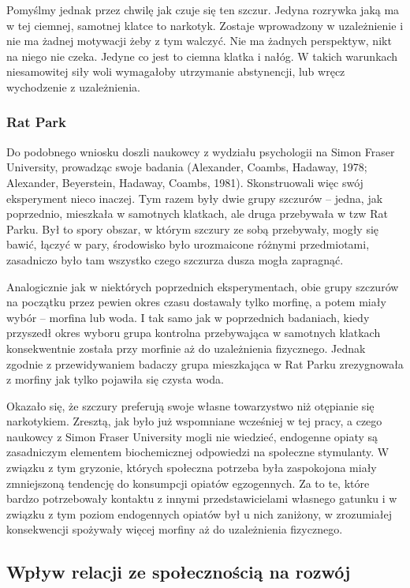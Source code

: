 \documentclass{psychol}
\begin{document}
Pomyślmy jednak przez chwilę jak czuje się ten szczur. Jedyna rozrywka jaką ma w tej ciemnej, samotnej klatce to narkotyk. Zostaje wprowadzony w uzależnienie i nie ma żadnej motywacji żeby z tym walczyć. Nie ma żadnych perspektyw, nikt na niego nie czeka. Jedyne co jest to ciemna klatka i nałóg. W takich warunkach niesamowitej siły woli wymagałoby utrzymanie abstynencji, lub wręcz wychodzenie z uzależnienia.

\subsubsection{Rat Park}

Do podobnego wniosku doszli naukowcy z wydziału psychologii na Simon Fraser University, prowadząc swoje badania (Alexander, Coambs, Hadaway, 1978; Alexander, Beyerstein, Hadaway, Coambs, 1981). Skonstruowali więc swój eksperyment nieco inaczej. Tym razem były dwie grupy szczurów -- jedna, jak poprzednio, mieszkała w samotnych klatkach, ale druga przebywała w tzw Rat Parku. Był to spory obszar, w którym szczury ze sobą przebywały, mogły się bawić, łączyć w pary, środowisko było urozmaicone różnymi przedmiotami, zasadniczo było tam wszystko czego szczurza dusza mogła zapragnąć.

Analogicznie jak w niektórych poprzednich eksperymentach, obie grupy szczurów na początku przez pewien okres czasu dostawały tylko morfinę, a potem miały wybór -- morfina lub woda. I tak samo jak w poprzednich badaniach, kiedy przyszedł okres wyboru grupa kontrolna przebywająca w samotnych klatkach konsekwentnie została przy morfinie aż do uzależnienia fizycznego. Jednak zgodnie z przewidywaniem badaczy grupa mieszkająca w Rat Parku zrezygnowała z morfiny jak tylko pojawiła się czysta woda.

Okazało się, że szczury preferują swoje własne towarzystwo niż otępianie się narkotykiem. Zresztą, jak \colorbox{yellow!30}{było już wspomniane} wcześniej w tej pracy, a czego naukowcy z Simon Fraser University mogli nie wiedzieć, endogenne opiaty są zasadniczym elementem biochemicznej odpowiedzi na społeczne stymulanty. W związku z tym gryzonie, których społeczna potrzeba była zaspokojona miały zmniejszoną tendencję do konsumpcji opiatów egzogennych. Za to te, które bardzo potrzebowały kontaktu z innymi przedstawicielami własnego gatunku i w związku z tym poziom endogennych opiatów był u nich zaniżony, w zrozumiałej konsekwencji spożywały więcej morfiny aż do uzależnienia fizycznego.

\subsection{Wpływ relacji ze społecznością na rozwój}
\end{document}
